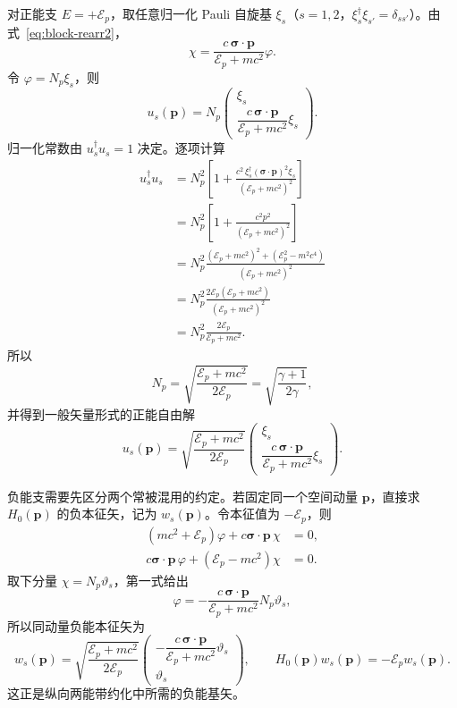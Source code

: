 对正能支 $E=+\mathcal E_p$，取任意归一化 Pauli 自旋基 $\xi_s$（$s=1,2$，$\xi_s^\dagger\xi_{s'}=\delta_{ss'}$）。由式~\eqref{eq:block-rearr2}，
\begin{equation}
 \chi=\frac{c\,\bm\sigma\cdot\bm p}{\mathcal E_p+mc^2}\varphi.
\end{equation}
令 $\varphi=N_p\xi_s$，则
\begin{equation}
 u_s(\bm p)
 =N_p
 \begin{pmatrix}
 \xi_s\\[0.35em]
 \dfrac{c\,\bm\sigma\cdot\bm p}{\mathcal E_p+mc^2}\xi_s
 \end{pmatrix}.
 \label{eq:u-general-unnorm}
\end{equation}
归一化常数由 $u_s^\dagger u_s=1$ 决定。逐项计算
\begin{align}
 u_s^\dagger u_s
 &=N_p^2\left[
 1+\frac{c^2\,\xi_s^\dagger(\bm\sigma\cdot\bm p)^2\xi_s}
 {(\mathcal E_p+mc^2)^2}\right]\\
 &=N_p^2\left[
 1+\frac{c^2p^2}{(\mathcal E_p+mc^2)^2}\right]\\
 &=N_p^2\frac{(\mathcal E_p+mc^2)^2+(\mathcal E_p^2-m^2c^4)}{(\mathcal E_p+mc^2)^2}\\
 &=N_p^2\frac{2\mathcal E_p(\mathcal E_p+mc^2)}{(\mathcal E_p+mc^2)^2}\\
 &=N_p^2\frac{2\mathcal E_p}{\mathcal E_p+mc^2}.
\end{align}
所以
\begin{equation}
 N_p=\sqrt{\frac{\mathcal E_p+mc^2}{2\mathcal E_p}}
 =\sqrt{\frac{\gamma+1}{2\gamma}},
\end{equation}
并得到一般矢量形式的正能自由解
\begin{equation}
 \boxed{
 u_s(\bm p)=
 \sqrt{\frac{\mathcal E_p+mc^2}{2\mathcal E_p}}
 \begin{pmatrix}
 \xi_s\\[0.45em]
 \dfrac{c\,\bm\sigma\cdot\bm p}{\mathcal E_p+mc^2}\xi_s
 \end{pmatrix}.}
 \label{eq:u-general}
\end{equation}

负能支需要先区分两个常被混用的约定。若固定同一个空间动量 $\bm p$，直接求 $H_0(\bm p)$ 的负本征矢，记为 $w_s(\bm p)$。令本征值为 $-\mathcal E_p$，则
\begin{align}
(mc^2+\mathcal E_p)\varphi+c\bm\sigma\cdot\bm p\,\chi&=0,\\
c\bm\sigma\cdot\bm p\,\varphi+(\mathcal E_p-mc^2)\chi&=0.
\end{align}
取下分量 $\chi=N_p\vartheta_s$，第一式给出
\begin{equation}
\varphi=-\frac{c\,\bm\sigma\cdot\bm p}{\mathcal E_p+mc^2}N_p\vartheta_s,
\end{equation}
所以同动量负能本征矢为
\begin{equation}
\boxed{
w_s(\bm p)=
\sqrt{\frac{\mathcal E_p+mc^2}{2\mathcal E_p}}
\begin{pmatrix}
-\dfrac{c\,\bm\sigma\cdot\bm p}{\mathcal E_p+mc^2}\vartheta_s\\[0.45em]
\vartheta_s
\end{pmatrix},
\qquad
H_0(\bm p)w_s(\bm p)=-\mathcal E_p w_s(\bm p).}
\label{eq:w-negative-same-momentum}
\end{equation}
这正是纵向两能带约化中所需的负能基矢。

